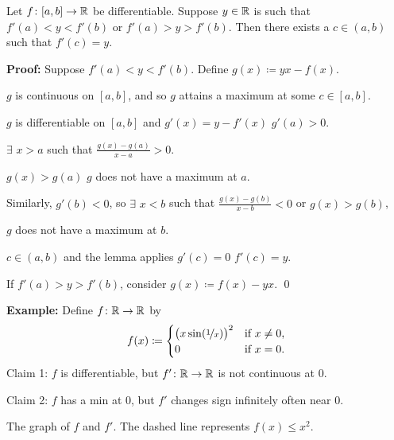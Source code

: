 \documentclass[10pt,aspectratio=149]{beamer}
\begin{document}
\begin{frame}

\begin{theorem}[Darboux]
Let $f \colon [a,b] \to {\mathbb{R}}$ be differentiable.  Suppose $y \in {\mathbb{R}}$ is such
that $f'(a) < y < f'(b)$ or
$f'(a) > y > f'(b)$.
Then there exists a $c \in (a,b)$ such that $f'(c) = y$.
\end{theorem}

\pause
\textbf{Proof:}
Suppose 
$f'(a) < y < f'(b)$.
\pause
Define
$g(x) \coloneqq yx - f(x)$.

\pause
$g$ is continuous on $[a,b]$, and so $g$ attains a maximum at some $c \in [a,b]$.

\pause
$g$ is differentiable on $[a,b]$ and $g'(x) = y-f'(x)$
\pause
\wthus $g'(a) > 0$.

\pause
\medskip
\thus \quad $\exists$ $x > a$ such that
$\displaystyle \frac{g(x)-g(a)}{x-a} > 0$.

\pause
\medskip

\thus \quad $g(x) > g(a)$
\pause
\wthus $g$ does not have a maximum at $a$.

\pause
\medskip

Similarly, $g'(b) < 0$, so $\exists$ $x < b$ such that
$\frac{g(x)-g(b)}{x-b} < 0$ or $g(x) > g(b)$,

\pause
\thus \quad $g$ does not have a maximum at $b$.

\pause
\medskip

\thus \quad $c \in (a,b)$ and the lemma applies  \wthus $g'(c)=0$
\pause
\wthus $f'(c) = y$.

\pause
\medskip

If $f'(a) > y > f'(b)$, consider $g(x) \coloneqq f(x)- yx$.
\qed

\end{frame}

\begin{frame}
\textbf{Example:}
Define $f \colon {\mathbb{R}} \to {\mathbb{R}}$ by
\begin{equation*}
f(x) \coloneqq
\begin{cases}
{\bigl( x \sin(\nicefrac{1}{x}) \bigr)}^2 & \text{if } x \not= 0, \\
0 & \text{if } x = 0.
\end{cases}
\end{equation*}
\pause
Claim 1: $f$ is differentiable, but $f' \colon {\mathbb{R}} \to {\mathbb{R}}$ is not continuous at
$0$.

\pause
\medskip

Claim 2: $f$ has a min at $0$, but $f'$
changes sign infinitely often near $0$.

\pause
\medskip


\medskip

The graph of $f$ and $f'$.  The dashed line represents $f(x) \leq x^2$.

\end{frame}
\end{document}
